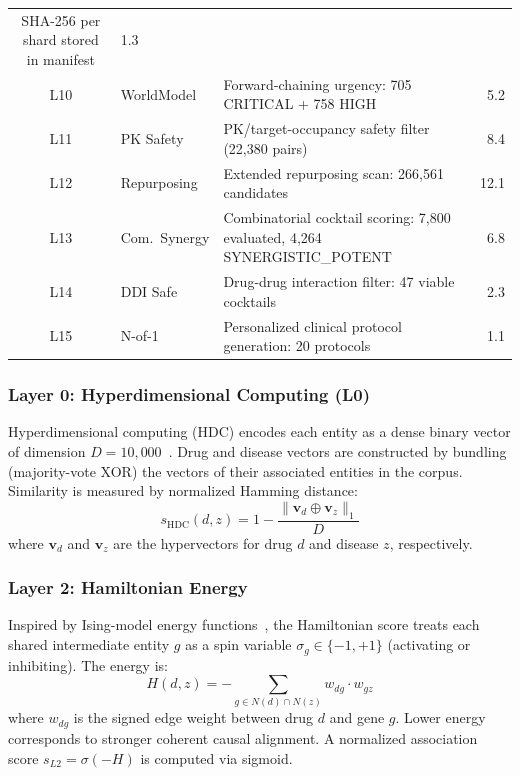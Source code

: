 \documentclass[11pt]{article}
\begin{document}
\begin{table}[h]
\begin{tabular}{clp{6.4cm}r}
                      SHA-256 per shard stored in manifest & 1.3 \\
L10 & WorldModel    & Forward-chaining urgency: 705 CRITICAL + 758 HIGH & 5.2 \\
L11 & PK Safety     & PK/target-occupancy safety filter (22,380 pairs) & 8.4 \\
L12 & Repurposing   & Extended repurposing scan: 266,561 candidates & 12.1 \\
L13 & Com.\ Synergy & Combinatorial cocktail scoring: 7,800 evaluated,
                      4,264 SYNERGISTIC\_POTENT & 6.8 \\
L14 & DDI Safe      & Drug-drug interaction filter: 47 viable cocktails & 2.3 \\
L15 & N-of-1        & Personalized clinical protocol generation:
                      20 protocols & 1.1 \\
\bottomrule
\end{tabular}
\end{table}

\subsubsection{Layer 0: Hyperdimensional Computing (L0)}
\label{sec:l0}
Hyperdimensional computing (HDC) encodes each entity as a dense binary
vector of dimension $D = 10{,}000$~\cite{kanerva2009hyperdimensional}.
Drug and disease vectors are constructed by bundling (majority-vote XOR)
the vectors of their associated entities in the corpus.
Similarity is measured by normalized Hamming distance:
\[
  s_{\mathrm{HDC}}(d, z) = 1 - \frac{\|\mathbf{v}_d \oplus \mathbf{v}_z\|_1}{D}
\]
where $\mathbf{v}_d$ and $\mathbf{v}_z$ are the hypervectors for drug $d$
and disease $z$, respectively.

\subsubsection{Layer 2: Hamiltonian Energy}
\label{sec:l2}
Inspired by Ising-model energy functions~\cite{hopfield1982neural},
the Hamiltonian score treats each shared intermediate entity $g$ as a
spin variable $\sigma_g \in \{-1, +1\}$ (activating or inhibiting).
The energy is:
\[
  H(d, z) = -\sum_{g \in N(d) \cap N(z)} w_{dg} \cdot w_{gz}
\]
where $w_{dg}$ is the signed edge weight between drug $d$ and gene $g$.
Lower energy corresponds to stronger coherent causal alignment.
A normalized association score $s_{L2} = \sigma(-H)$ is computed via sigmoid.
\end{document}
